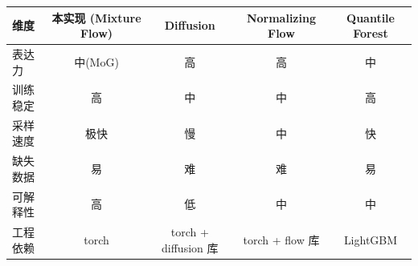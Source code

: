 \begin{center}
\small
\begin{tabular}{lcccc}
\toprule
维度 & 本实现 (Mixture Flow) & Diffusion & Normalizing Flow & Quantile Forest \\
\midrule
表达力 & 中(MoG)& 高 & 高 & 中 \\
训练稳定 & 高 & 中 & 中 & 高 \\
采样速度 & 极快 & 慢 & 中 & 快 \\
缺失数据 & 易 & 难 & 难 & 易 \\
可解释性 & 高 & 低 & 中 & 中 \\
工程依赖 & torch & torch + diffusion 库 & torch + flow 库 & LightGBM \\
\bottomrule
\end{tabular}
\end{center}

